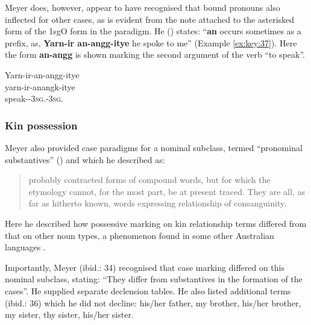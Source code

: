 Meyer does, however, appear to have recognised that bound pronouns also inflected for other cases, as is evident from the note attached to the asterisked form of the 1sgO form in the paradigm. He (\citeyear[23]{meyer_vocabulary_1843}) states: “\textbf{an} occurs sometimes as a prefix, as, \textbf{Yarn-ir an-angg-itye} he spoke to me” (Example \ref{ex:key:37}). Here the form \textbf{an-angg} is shown marking the second argument of the verb “to speak”.

\ea \label{ex:key:37}
\glll Yarn-ir-an-angg-itye \\
yarn-ir-anangk-itye \\
speak--3\textsc{sg}.-3\textsc{sg}.\footnotemark \\
\z

\subsubsection{Kin possession}
\label{sec:key:6.1.2.5}\label{bkm:Ref330037209}

Meyer also provided case paradigms for a nominal subclass, termed “pronominal substantives” () and which he described as:

\begin{quote}
probably contracted forms of compound words, but for which the etymology cannot, for the most part, be at present traced. They are all, as far as hitherto known, words expressing relationship of consanguinity. \citep[34]{meyer_vocabulary_1843}
\end{quote}

Here he described how possessive marking on kin relationship terms differed from that on other noun types, a phenomenon found in some other Australian languages \citep[396]{Dixon2002}.

Importantly, Meyer (ibid.: 34) recognised that case marking differed on this nominal subclass, stating: “They differ from substantives in the formation of the cases”. He supplied separate declension tables. He also listed additional terms (ibid.: 36) which he did not decline: his/her father, my brother, his/her brother, my sister, thy sister, his/her sister.

